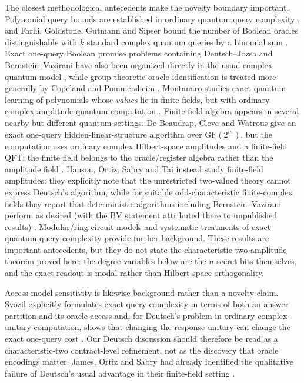 \documentclass[11pt]{article}
\begin{document}
The closest methodological antecedents make the novelty boundary important. Polynomial query bounds are established in ordinary quantum query complexity \cite{Beals2001}, and Farhi, Goldstone, Gutmann and Sipser bound the number of Boolean oracles distinguishable with $k$ standard complex quantum queries by a binomial sum \cite{Farhi1999}. Exact one-query Boolean promise problems containing Deutsch--Jozsa and Bernstein--Vazirani have also been organized directly in the usual complex quantum model \cite{Combarro2021}, while group-theoretic oracle identification is treated more generally by Copeland and Pommersheim \cite{Copeland2021}. Montanaro studies exact quantum learning of polynomials whose \emph{values} lie in finite fields, but with ordinary complex-amplitude quantum computation \cite{Montanaro2012}. Finite-field algebra appears in several nearby but different quantum settings. De Beaudrap, Cleve and Watrous give an exact one-query hidden-linear-structure algorithm over $\mathrm{GF}(2^m)$, but the computation uses ordinary complex Hilbert-space amplitudes and a finite-field QFT; the finite field belongs to the oracle/register algebra rather than the amplitude field \cite{deBeaudrap2002}. Hanson, Ortiz, Sabry and Tai instead study finite-field amplitudes: they explicitly note that the unrestricted two-valued theory cannot express Deutsch's algorithm, while for suitable odd-characteristic finite-complex fields they report that deterministic algorithms including Bernstein--Vazirani perform as desired (with the BV statement attributed there to unpublished results) \cite{Hanson2014}. Modular/ring circuit models \cite{deBeaudrap2014} and systematic treatments of exact quantum query complexity \cite{MontanaroJozsa2015} provide further background. These results are important antecedents, but they do not state the characteristic-two amplitude theorem proved here: the degree variables below are the $n$ secret bits themselves, and the exact readout is modal rather than Hilbert-space orthogonality.

Access-model sensitivity is likewise background rather than a novelty claim. Svozil explicitly formulates exact query complexity in terms of both an answer partition and its oracle access and, for Deutsch's problem in ordinary complex-unitary computation, shows that changing the response unitary can change the exact one-query cost \cite{Svozil2026}. Our Deutsch discussion should therefore be read as a characteristic-two contract-level refinement, not as the discovery that oracle encodings matter. James, Ortiz and Sabry had already identified the qualitative failure of Deutsch's usual advantage in their finite-field setting \cite{James2011}.
\end{document}
